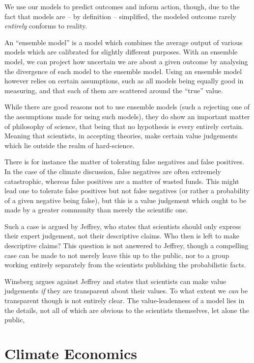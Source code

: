 \documentclass[12pt]{report}
\begin{document}
We use our models to predict outcomes and inform action, though, due to the fact
that models are -- by definition -- simplified, the modeled outcome rarely
\emph{entirely} conforms to reality.

An ``ensemble model'' is a model which combines the average output of various
models which are calibrated for slightly different purposes. With an ensemble
model, we can project how uncertain we are about a given outcome by analysing
the divergence of each model to the ensemble model.  Using an ensemble model
however relies on certain assumptions, such as all models being equally good in
measuring, and that each of them are scattered around the ``true'' value.

While there are good reasons not to use ensemble models (such a rejecting one of
the assumptions made for using such models), they do show an important matter of
philosophy of science, that being that no hypothesis is every entirely certain.
Meaning that scientists, in accepting theories, make certain value judgements
which lie outside the realm of hard-science.

There is for instance the matter of tolerating false negatives and false
positives. In the case of the climate discussion, false negatives are often
extremely catastrophic, whereas false positives are a matter of wasted funds.
This might lead one to tolerate false positives but not false negatives (or
rather a probability of a given negative being false), but this is a value
judgement which ought to be made by a greater community than merely the
scientific one.

Such a case is argued by Jeffrey, who states that scientists should only express
their expert judgement, not their descriptive claims. Who then is left to make
descriptive claims? This question is not answered to Jeffrey, though a
compelling case can be made to not merely leave this up to the public, nor to a
group working entirely separately from the scientists publishing the
probabilistic facts.

Winsberg argues against Jeffrey and states that scientists can make value
judgements \emph{if} they are transparent about their values. To what extent we
\emph{can} be transparent though is not entirely clear. The value-leadenness of
a model lies in the details, not all of which are obvious to the scientists
themselves, let alone the public,

\chapter{Climate Economics}
\end{document}
